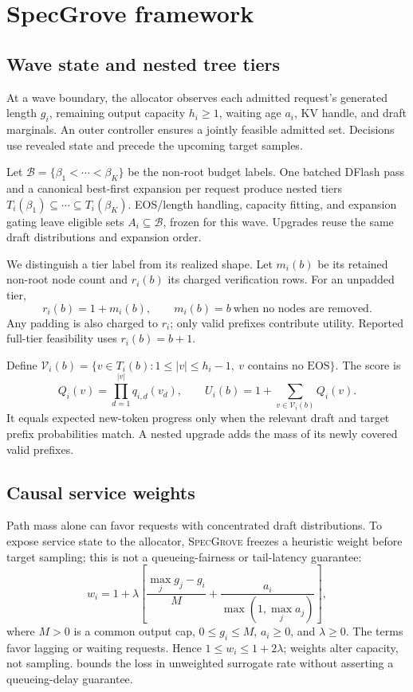 \documentclass{article}
\newcommand{\method}{\textsc{SpecGrove}\xspace}
\begin{document}
\section{SpecGrove framework}
\label{sec:framework}
\subsection{Wave state and nested tree tiers}
\label{sec:tiers}
At a wave boundary, the allocator observes each admitted request's generated length $g_i$, remaining output capacity $h_i\ge1$, waiting age $a_i$, KV handle, and draft marginals. An outer controller ensures a jointly feasible admitted set. Decisions use revealed state and precede the upcoming target samples.

Let $\mathcal B=\{\beta_1<\cdots<\beta_K\}$ be the non-root budget labels. One batched DFlash pass and a canonical best-first expansion per request produce nested tiers $T_i(\beta_1)\subseteq\cdots\subseteq T_i(\beta_K)$. EOS/length handling, capacity fitting, and expansion gating leave eligible sets $A_i\subseteq\mathcal B$, frozen for this wave. Upgrades reuse the same draft distributions and expansion order.

We distinguish a tier label from its realized shape. Let $m_i(b)$ be its retained non-root node count and $r_i(b)$ its charged verification rows. For an unpadded tier,
\begin{equation}
r_i(b)=1+m_i(b),\qquad m_i(b)=b\ \text{when no nodes are removed}.
\label{eq:rows}
\end{equation}
Any padding is also charged to $r_i$; only valid prefixes contribute utility. Reported full-tier feasibility uses $r_i(b)=b+1$.

Define $\mathcal V_i(b)=\{v\in T_i(b):1\le|v|\le h_i-1,\ v\text{ contains no EOS}\}$. The score is
\begin{equation}
Q_i(v)=\prod_{d=1}^{|v|}q_{i,d}(v_d),\qquad
U_i(b)=1+\sum_{v\in\mathcal V_i(b)}Q_i(v).
\label{eq:utility}
\end{equation}
It equals expected new-token progress only when the relevant draft and target prefix probabilities match. A nested upgrade adds the mass of its newly covered valid prefixes.

\subsection{Causal service weights}
\label{sec:weights}
Path mass alone can favor requests with concentrated draft distributions. To expose service state to the allocator, \method freezes a heuristic weight before target sampling; this is not a queueing-fairness or tail-latency guarantee:
\begin{equation}
w_i=1+\lambda\left[\frac{\max_jg_j-g_i}{M}
+\frac{a_i}{\max(1,\max_ja_j)}\right],
\label{eq:weight}
\end{equation}
where $M>0$ is a common output cap, $0\le g_i\le M$, $a_i\ge0$, and $\lambda\ge0$. The terms favor lagging or waiting requests. Hence $1\le w_i\le1+2\lambda$; weights alter capacity, not sampling.  bounds the loss in unweighted surrogate rate without asserting a queueing-delay guarantee.
\end{document}
